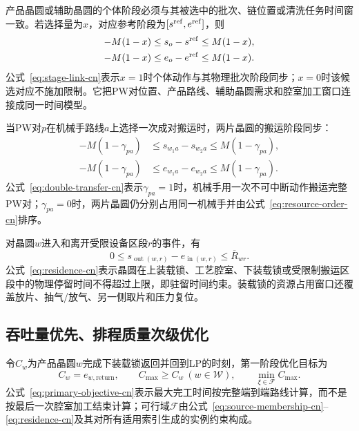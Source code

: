 \documentclass[final,5p,times,twocolumn]{elsarticle}
\begin{document}
产品晶圆或辅助晶圆的个体阶段必须与其被选中的批次、链位置或清洗任务时间窗一致。若选择量为$x$，对应参考阶段为$[s^{\rm ref},e^{\rm ref}]$，则
\begin{equation}
\begin{aligned}
-M(1-x)&\le s_o-s^{\rm ref}\le M(1-x),\\
-M(1-x)&\le e_o-e^{\rm ref}\le M(1-x).
\end{aligned}
\label{eq:stage-link-cn}
\end{equation}
公式~\eqref{eq:stage-link-cn}表示$x=1$时个体动作与其物理批次阶段同步；$x=0$时该候选对应不施加限制。它把PW对位置、产品路线、辅助晶圆需求和腔室加工窗口连接成同一时间模型。

当PW对$p$在机械手路线$a$上选择一次成对搬运时，两片晶圆的搬运阶段同步：
\begin{equation}
\begin{aligned}
-M(1-\gamma_{pa})&\le s_{w_1a}-s_{w_2a}\le M(1-\gamma_{pa}),\\
-M(1-\gamma_{pa})&\le e_{w_1a}-e_{w_2a}\le M(1-\gamma_{pa}).
\end{aligned}
\label{eq:double-transfer-cn}
\end{equation}
公式~\eqref{eq:double-transfer-cn}表示$\gamma_{pa}=1$时，机械手用一次不可中断动作搬运完整PW对；$\gamma_{pa}=0$时，两片晶圆仍分别占用同一机械手并由公式~\eqref{eq:resource-order-cn}排序。

对晶圆$w$进入和离开受限设备区段$r$的事件，有
\begin{equation}
0\le s_{\operatorname{out}(w,r)}-e_{\operatorname{in}(w,r)}
\le\overline R_{wr}.
\label{eq:residence-cn}
\end{equation}
公式~\eqref{eq:residence-cn}表示晶圆在上装载锁、工艺腔室、下装载锁或受限制搬运区段中的物理停留时间不得超过上限，即驻留时间约束。装载锁的资源占用窗口还覆盖放片、抽气/放气、另一侧取片和压力复位。

\subsection{吞吐量优先、排程质量次级优化}

令$C_w$为产品晶圆$w$完成下装载锁返回并回到LP的时刻，第一阶段优化目标为
\begin{equation}
C_w=e_{w,\mathrm{return}},\qquad
C_{\max}\ge C_w\ (w\in\mathcal W),\qquad
\min_{\xi\in\mathcal F}C_{\max}.
\label{eq:primary-objective-cn}
\end{equation}
公式~\eqref{eq:primary-objective-cn}表示最大完工时间按完整端到端路线计算，而不是按最后一次腔室加工结束计算；可行域$\mathcal F$由公式~\eqref{eq:source-membership-cn}--\eqref{eq:residence-cn}及其对所有适用索引生成的实例约束构成。
\end{document}
